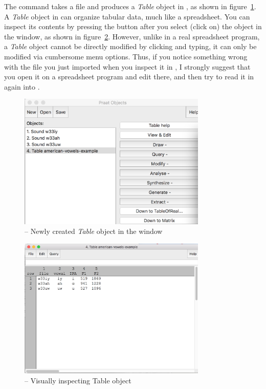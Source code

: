 The command  takes a  file and produces a \emph{Table} object in \Praat{}, as shown in figure~\ref{praat-table-in-objects}. A \emph{Table} object in \Praat{} can organize tabular data, much like a spreadsheet. You can inspect its contents by pressing the button  after you select (click on) the object in the  window, as shown in figure~\ref{praat-inspect-table}. However, unlike in a real spreadsheet program, a \Praat{} \emph{Table} object cannot be directly modified by clicking and typing, it can only be modified via cumbersome menu options. Thus, if you notice something wrong with the  file you just imported when you inspect it in \Praat{}, I strongly suggest that you open it on a spreadsheet program and edit there, and then try to read it in again into \Praat{}.

\begin{figure}[!tbp]
\caption{\Praat{} -- Newly created \emph{Table} object in the  window}
\label{praat-table-in-objects}
	\begin{center}
		\includegraphics[width=0.8\textwidth]{./figures/Praat-12-Table-object-in-window}
	\end{center}
\end{figure}


\begin{figure}[!tbp]
\caption{\Praat{} -- Visually inspecting Table object}
\label{praat-inspect-table}
	\begin{center}
		\includegraphics[width=0.8\textwidth]{./figures/Praat-13-Table-inspect}
	\end{center}
\end{figure}

